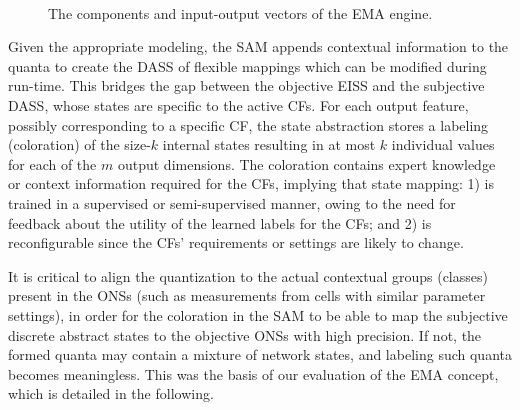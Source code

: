 		 	\begin{figure}[ht]
		 		\centering
		 		 \\
		 		\caption[EMA components]{The components and input-output vectors of the EMA engine.}
		 		\label{fig:ema_overview}
		 	\end{figure}
		 	
		 	Given the appropriate modeling, the \ac{SAM} appends contextual information to the quanta to create the \ac{DASS} of flexible mappings which can be modified during run-time.
		 	This bridges the gap between the objective \ac{EISS} and the subjective \ac{DASS}, whose states are specific to the active \acp{CF}.
		 	For each output feature, possibly corresponding to a specific \ac{CF}, the state abstraction stores a labeling (coloration) of the size-$k$ internal states resulting in at most $k$ individual values for each of the $m$ output dimensions.
		 	The coloration contains expert knowledge or context information required for the \acp{CF}, implying that state mapping: 1) is trained in a supervised or semi-supervised manner, owing to the need for feedback about the utility of the learned labels for the \acp{CF}; and 2) is reconfigurable since the \acp{CF}' requirements or settings are likely to change.
		 	
			It is critical to align the quantization to the actual contextual groups (classes) present in the \acp{ONS} (such as measurements from cells with similar parameter settings), in order for the coloration in the \ac{SAM} to be able to map the subjective discrete abstract states to the objective \acp{ONS} with high precision.
		 	If not, the formed quanta may contain a mixture of network states, and labeling such quanta becomes meaningless.
		 	This was the basis of our evaluation of the \ac{EMA} concept, which is detailed in the following.	
		 	
